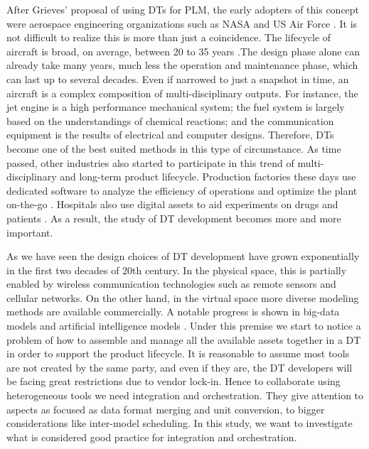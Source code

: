 \documentclass[journal,onecolumn]{IEEEtran} %
\begin{document}
After Grieves' proposal of using DTs for PLM, the early adopters of this concept were aerospace engineering organizations such as NASA and US Air Force \cite{Grieves2019}. It is not difficult to realize this is more than just a coincidence. The lifecycle of aircraft is broad, on average, between 20 to 35 years \cite{boeing}.The design phase alone can already take many years, much less the operation and maintenance phase, which can last up to several decades. Even if narrowed to just a snapshot in time, an aircraft is a complex composition of multi-disciplinary outputs. For instance, the jet engine is a high performance mechanical system; the fuel system is largely based on the understandings of chemical reactions; and the communication equipment is the results of electrical and computer designs. Therefore, DTs become one of the best suited methods in this type of circumstance. As time passed, other industries also started to participate in this trend of multi-disciplinary and long-term product lifecycle. Production factories these days use dedicated software to analyze the efficiency of operations and optimize the plant on-the-go \cite{Zheng2018}. Hospitals also use digital assets to aid experiments on drugs and patients \cite{Kwon2022}. As a result, the study of DT development becomes more and more important.

As we have seen the design choices of DT development have grown exponentially in the first two decades of 20th century. In the physical space, this is partially enabled by wireless communication technologies such as remote sensors and cellular networks. On the other hand, in the virtual space more diverse modeling methods are available commercially. A notable progress is shown in big-data models and artificial intelligence models \cite{Duan2019}. Under this premise we start to notice a problem of how to assemble and manage all the available assets together in a DT in order to support the product lifecycle. It is reasonable to assume most tools are not created by the same party, and even if they are, the DT developers will be facing great restrictions due to vendor lock-in. Hence to collaborate using heterogeneous tools we need integration and orchestration. They give attention to aspects as focused as data format merging and unit conversion, to bigger considerations like inter-model scheduling. In this study, we want to investigate what is considered good practice for integration and orchestration. 
\end{document}

